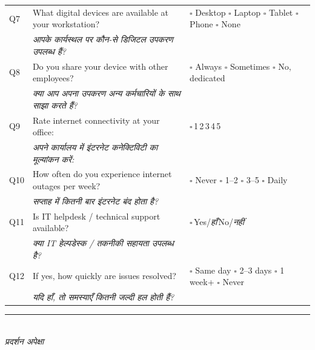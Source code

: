 \documentclass[10pt,a4paper]{article}
\newcommand{\likert}{{\Large$\square$}\,1\quad{\Large$\square$}\,2\quad{\Large$\square$}\,3\quad{\Large$\square$}\,4\quad{\Large$\square$}\,5}
\newcommand{\ymark}{{\Large$\square$}\,Yes/{\hindifont\itshape हाँ}\quad{\Large$\square$}\,No/{\hindifont\itshape नहीं}}
\begin{document}
\noindent\begin{tabularx}{\textwidth}{@{}L{0.8cm} X L{5.2cm}@{}}
Q7 & What digital devices are available at your workstation? & {\Large$\square$} Desktop {\Large$\square$} Laptop {\Large$\square$} Tablet {\Large$\square$} Phone {\Large$\square$} None \\
 & {\hindifont\small\itshape\color{black!70} आपके कार्यस्थल पर कौन-से डिजिटल उपकरण उपलब्ध हैं?} & \\[3pt]
Q8 & Do you share your device with other employees? & {\Large$\square$} Always {\Large$\square$} Sometimes {\Large$\square$} No, dedicated \\
 & {\hindifont\small\itshape\color{black!70} क्या आप अपना उपकरण अन्य कर्मचारियों के साथ साझा करते हैं?} & \\[3pt]
Q9 & Rate internet connectivity at your office: & \likert \\
 & {\hindifont\small\itshape\color{black!70} अपने कार्यालय में इंटरनेट कनेक्टिविटी का मूल्यांकन करें:} & \\[3pt]
Q10 & How often do you experience internet outages per week? & {\Large$\square$} Never {\Large$\square$} 1--2 {\Large$\square$} 3--5 {\Large$\square$} Daily \\
 & {\hindifont\small\itshape\color{black!70} सप्ताह में कितनी बार इंटरनेट बंद होता है?} & \\[3pt]
Q11 & Is IT helpdesk / technical support available? & \ymark \\
 & {\hindifont\small\itshape\color{black!70} क्या IT हेल्पडेस्क / तकनीकी सहायता उपलब्ध है?} & \\[3pt]
Q12 & If yes, how quickly are issues resolved? & {\Large$\square$} Same day {\Large$\square$} 2--3 days {\Large$\square$} 1 week+ {\Large$\square$} Never \\
 & {\hindifont\small\itshape\color{black!70} यदि हाँ, तो समस्याएँ कितनी जल्दी हल होती हैं?} & \\[3pt]
\end{tabularx}
\vspace{3pt}
\noindent\rule{\textwidth}{0.3pt}\vspace{3pt}
\\
{\hindifont\itshape\color{black!70} प्रदर्शन अपेक्षा}\vspace{3pt}
\end{document}

